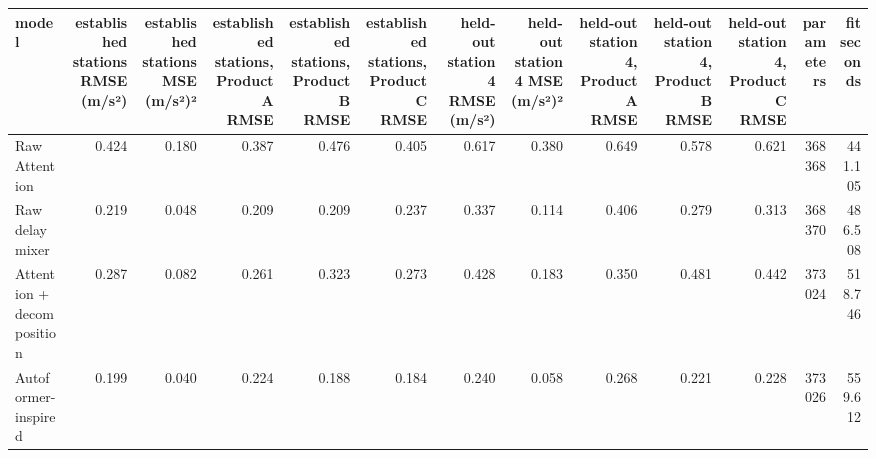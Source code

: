 \begin{tabular}{lrrrrrrrrrrrr}
\toprule
model & established stations RMSE (m/s²) & established stations MSE (m/s²)² & established stations, Product A RMSE & established stations, Product B RMSE & established stations, Product C RMSE & held-out station 4 RMSE (m/s²) & held-out station 4 MSE (m/s²)² & held-out station 4, Product A RMSE & held-out station 4, Product B RMSE & held-out station 4, Product C RMSE & parameters & fit seconds \\
\midrule
Raw Attention & 0.424 & 0.180 & 0.387 & 0.476 & 0.405 & 0.617 & 0.380 & 0.649 & 0.578 & 0.621 & 368368 & 441.105 \\
Raw delay mixer & 0.219 & 0.048 & 0.209 & 0.209 & 0.237 & 0.337 & 0.114 & 0.406 & 0.279 & 0.313 & 368370 & 486.508 \\
Attention + decomposition & 0.287 & 0.082 & 0.261 & 0.323 & 0.273 & 0.428 & 0.183 & 0.350 & 0.481 & 0.442 & 373024 & 518.746 \\
Autoformer-inspired & 0.199 & 0.040 & 0.224 & 0.188 & 0.184 & 0.240 & 0.058 & 0.268 & 0.221 & 0.228 & 373026 & 559.612 \\
\bottomrule
\end{tabular}
